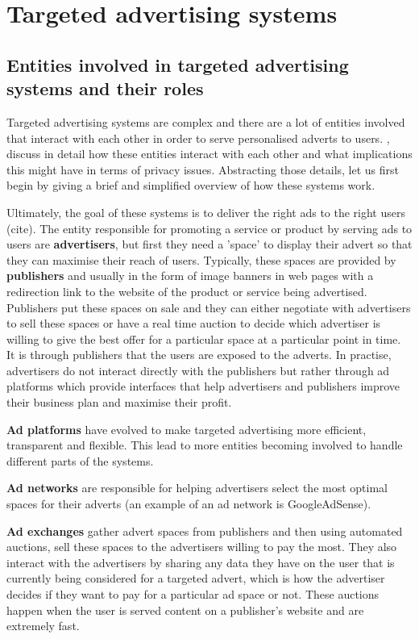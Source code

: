 \documentclass{l4proj}
\begin{document}
\section{Targeted advertising systems}
\label{targeted}
\subsection{Entities involved in targeted advertising systems and their roles}
Targeted advertising systems are complex and there are a lot of entities involved that interact with each other in order to serve personalised adverts to users. \cite{Estrada-Jimenez2017}, discuss in detail how these entities interact with each other and what implications this might have in terms of privacy issues. Abstracting those details, let us first begin by giving a brief and simplified overview of how these systems work. 

Ultimately, the goal of these systems is to deliver the right ads to the right users (cite). The entity responsible for promoting a service or product by serving ads to users are \textbf{advertisers}, but first they need a 'space' to display their advert so that they can maximise their reach of users. Typically, these spaces are provided by \textbf{publishers} and usually in the form of image banners in web pages with a redirection link to the website of the product or service being advertised. Publishers put these spaces on sale and they can either negotiate with advertisers to sell these spaces or have a real time auction to decide which advertiser is willing to give the best offer for a particular space at a particular point in time. It is through publishers that the users are exposed to the adverts. In practise, advertisers do not interact directly with the publishers but rather through ad platforms which provide interfaces that help advertisers and publishers improve their business plan and maximise their profit.

\textbf{Ad platforms} have evolved to make targeted advertising more efficient, transparent and flexible. This lead to more entities becoming involved to handle different parts of the systems. 

\textbf{Ad networks} are responsible for helping advertisers select the most optimal spaces for their adverts (an example of an ad network is GoogleAdSense).

\textbf{Ad exchanges} gather advert spaces from publishers and then using automated auctions, sell these spaces to the advertisers willing to pay the most. They also interact with the advertisers by sharing any data they have on the user that is currently being considered for a targeted advert, which is how the advertiser decides if they want to pay for a particular ad space or not. These auctions happen when the user is served content on a publisher's website and are extremely fast.
\end{document}
